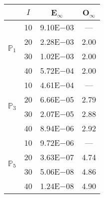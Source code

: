 \begin{table}[H]
\centering
\begin{tabular}{@{}l c c c@{}}
\toprule
 & $I$ & E$_{\infty}$ & O$_{\infty}$\\
\midrule
\multirow{4}{*}{$\mathbb{P}_{1}$}
 & 10 & 9.10E$-$03 & ---\\
 & 20 & 2.28E$-$03 & 2.00  \\
 & 30 & 1.02E$-$03 & 2.00  \\
 & 40 & 5.72E$-$04 & 2.00  \\
\midrule
\multirow{4}{*}{$\mathbb{P}_{3}$}
 & 10 & 4.61E$-$04 & ---\\
 & 20 & 6.66E$-$05 & 2.79  \\
 & 30 & 2.07E$-$05 & 2.88  \\
 & 40 & 8.94E$-$06 & 2.92  \\
\midrule
\multirow{4}{*}{$\mathbb{P}_{5}$}
 & 10 & 9.72E$-$06 & ---\\
 & 20 & 3.63E$-$07 & 4.74  \\
 & 30 & 5.06E$-$08 & 4.86  \\
 & 40 & 1.24E$-$08 & 4.90  \\
\bottomrule
\end{tabular}
\end{table}
